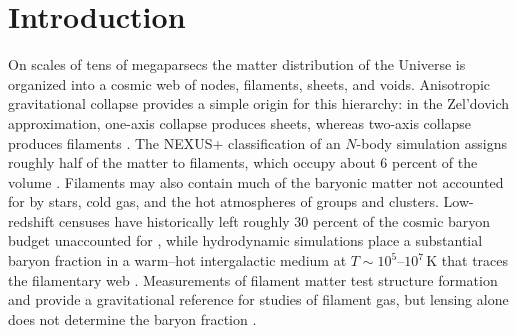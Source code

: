 %
%
%

\section{Introduction}
\label{sec:intro}

On scales of tens of megaparsecs the matter distribution of the Universe is
organized into a cosmic web of nodes, filaments, sheets, and voids. Anisotropic
gravitational collapse provides a simple origin for this hierarchy: in the
Zel'dovich approximation, one-axis collapse produces sheets, whereas two-axis
collapse produces filaments
\citep{Zeldovich1970, BondKofmanPogosyan1996}.
The NEXUS+ classification of an $N$-body simulation assigns roughly half of
the matter to filaments, which occupy about 6 percent of the volume
\citep{Cautun2014}. Filaments may also contain much of the baryonic matter
not accounted for by stars, cold gas, and the hot atmospheres of groups and
clusters. Low-redshift censuses have historically left roughly 30 percent of
the cosmic baryon budget unaccounted for \citep{FukugitaHoganPeebles1998,
Shull2012}, while hydrodynamic simulations place a substantial baryon
fraction in a warm--hot intergalactic medium at
$T\sim10^{5}$--$10^{7}\,\mathrm{K}$ that traces the filamentary web
\citep{CenOstriker1999}. Measurements of filament matter test structure
formation and provide a gravitational reference for studies of filament gas,
but lensing alone does not determine the baryon fraction
\citep{deGraaff2019, Tanimura2020, Nicastro2018}.

